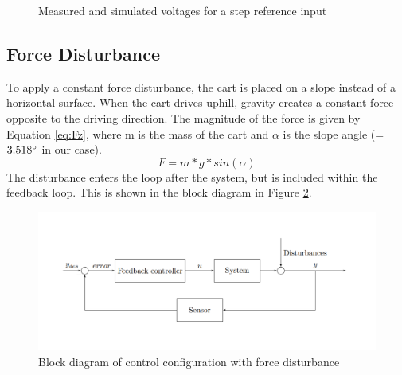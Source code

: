 \documentclass[a4paper,kul]{kulakarticle} %
\begin{document}
\begin{figure}[htp!]
\begin{subfigure}[b]{0.49\textwidth}
	\end{subfigure}
	\caption{Measured and simulated voltages for a step reference input}
	\label{fig:voltagestepresponse}
\end{figure}
\newpage
\subsection{Force Disturbance}
To apply a constant force disturbance, the cart is placed on a slope instead of a horizontal surface. When the cart drives uphill, gravity creates a constant force opposite to the driving direction. The magnitude of the force is given by Equation \ref{eq:Fz}, where m is the mass of the cart and $\alpha$ is the slope angle (= $3.518\degree$ in our case). 
\begin{equation}
	\label{eq:Fz}
	F = m*g*sin(\alpha)
\end{equation}
The disturbance enters the loop after the system, but is included within the feedback loop. This is shown in the block diagram in Figure \ref{fig: blockdiagram}.
\begin{figure}[htp!]
	\centering
	\includegraphics[width=\linewidth]{blockdiagram.png}
	\caption{Block diagram of control configuration with force disturbance \cite{tikz}}
	\label{fig: blockdiagram}
\end{figure}
\end{document}
